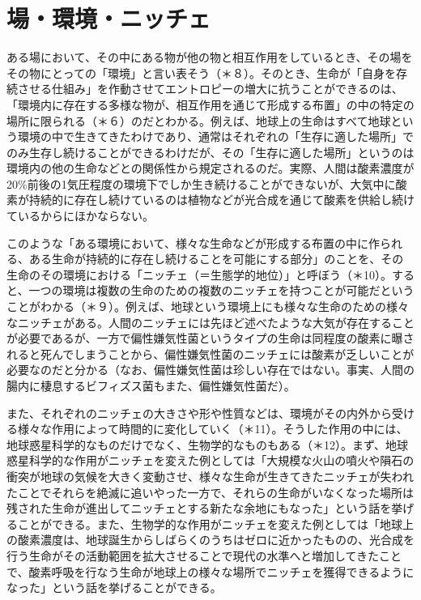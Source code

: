 \documentclass[
]{ltjsarticle}
\begin{document}
\section{場・環境・ニッチェ}\label{ux5834ux74b0ux5883ux30cbux30c3ux30c1ux30a7}

ある場において、その中にある物が他の物と相互作用をしているとき、その場をその物にとっての「環境」と言い表そう（＊８）。そのとき、生命が「自身を存続させる仕組み」を作動させてエントロピーの増大に抗うことができるのは、「環境内に存在する多様な物が、相互作用を通じて形成する布置」の中の特定の場所に限られる（＊６）のだとわかる。例えば、地球上の生命はすべて地球という環境の中で生きてきたわけであり、通常はそれぞれの「生存に適した場所」でのみ生存し続けることができるわけだが、その「生存に適した場所」というのは環境内の他の生命などとの関係性から規定されるのだ。実際、人間は酸素濃度が20\%前後の1気圧程度の環境下でしか生き続けることができないが、大気中に酸素が持続的に存在し続けているのは植物などが光合成を通じて酸素を供給し続けているからにほかならない。

このような「ある環境において、様々な生命などが形成する布置の中に作られる、ある生命が持続的に存在し続けることを可能にする部分」のことを、その生命のその環境における「ニッチェ（＝生態学的地位）」と呼ぼう（＊10）。すると、一つの環境は複数の生命のための複数のニッチェを持つことが可能だということがわかる（＊９）。例えば、地球という環境上にも様々な生命のための様々なニッチェがある。人間のニッチェには先ほど述べたような大気が存在することが必要であるが、一方で偏性嫌気性菌というタイプの生命は同程度の酸素に曝されると死んでしまうことから、偏性嫌気性菌のニッチェには酸素が乏しいことが必要なのだと分かる（なお、偏性嫌気性菌は珍しい存在ではない。事実、人間の腸内に棲息するビフィズス菌もまた、偏性嫌気性菌だ）。

また、それぞれのニッチェの大きさや形や性質などは、環境がその内外から受ける様々な作用によって時間的に変化していく（＊11）。そうした作用の中には、地球惑星科学的なものだけでなく、生物学的なものもある（＊12）。まず、地球惑星科学的な作用がニッチェを変えた例としては「大規模な火山の噴火や隕石の衝突が地球の気候を大きく変動させ、様々な生命が生きてきたニッチェが失われたことでそれらを絶滅に追いやった一方で、それらの生命がいなくなった場所は残された生命が進出してニッチェとする新たな余地にもなった」という話を挙げることができる。また、生物学的な作用がニッチェを変えた例としては「地球上の酸素濃度は、地球誕生からしばらくのうちはゼロに近かったものの、光合成を行う生命がその活動範囲を拡大させることで現代の水準へと増加してきたことで、酸素呼吸を行なう生命が地球上の様々な場所でニッチェを獲得できるようになった」という話を挙げることができる。
\end{document}
